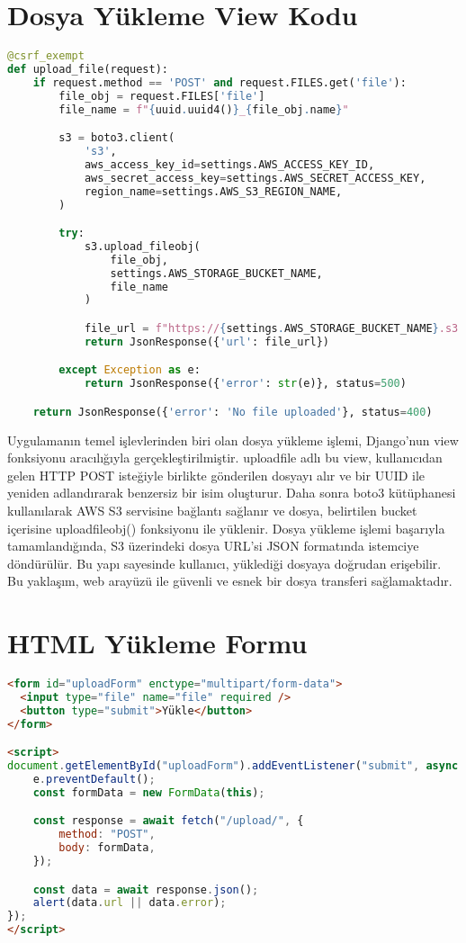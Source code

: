 \section{Dosya Yükleme View Kodu}
\begin{lstlisting}[language=Python, caption=upload_file fonksiyonu]
@csrf_exempt
def upload_file(request):
    if request.method == 'POST' and request.FILES.get('file'):
        file_obj = request.FILES['file']
        file_name = f"{uuid.uuid4()}_{file_obj.name}"

        s3 = boto3.client(
            's3',
            aws_access_key_id=settings.AWS_ACCESS_KEY_ID,
            aws_secret_access_key=settings.AWS_SECRET_ACCESS_KEY,
            region_name=settings.AWS_S3_REGION_NAME,
        )

        try:
            s3.upload_fileobj(
                file_obj,
                settings.AWS_STORAGE_BUCKET_NAME,
                file_name
            )

            file_url = f"https://{settings.AWS_STORAGE_BUCKET_NAME}.s3.{settings.AWS_S3_REGION_NAME}.amazonaws.com/{file_name}"
            return JsonResponse({'url': file_url})

        except Exception as e:
            return JsonResponse({'error': str(e)}, status=500)

    return JsonResponse({'error': 'No file uploaded'}, status=400)
\end{lstlisting}

Uygulamanın temel işlevlerinden biri olan dosya yükleme işlemi, Django’nun view fonksiyonu aracılığıyla gerçekleştirilmiştir. uploadfile adlı bu view, kullanıcıdan gelen HTTP POST isteğiyle birlikte gönderilen dosyayı alır ve bir UUID ile yeniden adlandırarak benzersiz bir isim oluşturur. Daha sonra boto3 kütüphanesi kullanılarak AWS S3 servisine bağlantı sağlanır ve dosya, belirtilen bucket içerisine uploadfileobj() fonksiyonu ile yüklenir. Dosya yükleme işlemi başarıyla tamamlandığında, S3 üzerindeki dosya URL’si JSON formatında istemciye döndürülür. Bu yapı sayesinde kullanıcı, yüklediği dosyaya doğrudan erişebilir. Bu yaklaşım, web arayüzü ile güvenli ve esnek bir dosya transferi sağlamaktadır.

\section{HTML Yükleme Formu}
\begin{lstlisting}[language=html, caption=upload.html]
<form id="uploadForm" enctype="multipart/form-data">
  <input type="file" name="file" required />
  <button type="submit">Yükle</button>
</form>

<script>
document.getElementById("uploadForm").addEventListener("submit", async function (e) {
    e.preventDefault();
    const formData = new FormData(this);

    const response = await fetch("/upload/", {
        method: "POST",
        body: formData,
    });

    const data = await response.json();
    alert(data.url || data.error);
});
</script>
\end{lstlisting}

